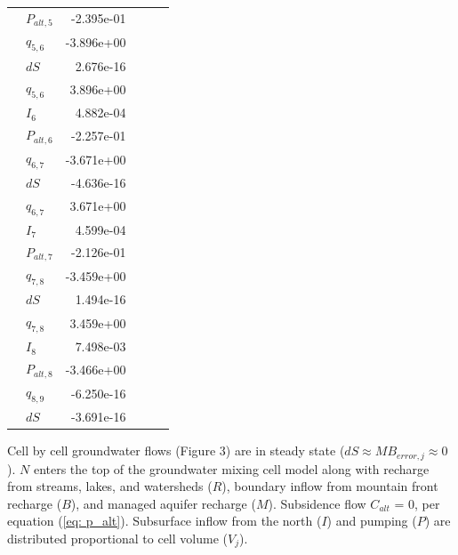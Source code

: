 \begin{threeparttable}
\begin{table}[H]
{\begin{tabular}{rlrrrr}
			& $P_{alt, 5}$ & -2.395e-01 \\ 
			& $q_{5,6}$ & -3.896e+00 \\ 
			& $dS$ & 2.676e-16 \\ 
			\hline
			\parbox[t]{2mm}{}
			& $q_{5,6}$ & 3.896e+00 \\ 
			& $I_6$ & 4.882e-04 \\ 
			& $P_{alt, 6}$ & -2.257e-01 \\ 
			& $q_{6,7}$ & -3.671e+00 \\ 
			& $dS$ & -4.636e-16 \\ 
			\hline
			\parbox[t]{2mm}{}
			& $q_{6,7}$ & 3.671e+00 \\ 
			& $I_7$ & 4.599e-04 \\ 
			& $P_{alt, 7}$ & -2.126e-01 \\ 
			& $q_{7,8}$ & -3.459e+00 \\ 
			& $dS$ & 1.494e-16 \\ 
			\hline
			\parbox[t]{2mm}{}
			& $q_{7,8}$ & 3.459e+00 \\ 
			& $I_8$ & 7.498e-03 \\ 
			& $P_{alt, 8}$ & -3.466e+00 \\ 
			& $q_{8,9}$ & -6.250e-16 \\ 
			& $dS$ & -3.691e-16 \\ 
			\hline
			
		\end{tabular}
	}
		Cell by cell groundwater flows (Figure 3) are in steady state ($dS \approx MB_{error, j} \approx 0$). $N$ enters the top of the groundwater mixing cell model along with recharge from streams, lakes, and watersheds ($R$), boundary inflow from mountain front recharge ($B$), and managed aquifer recharge ($M$). Subsidence flow $C_{alt}$ = 0, per equation (\ref{eq: p_alt}). Subsurface inflow from the north ($I$) and pumping ($P$) are distributed proportional to cell volume ($V_j$). 
		
		\label{ap_b_cbc}
	\end{table}
	
\end{threeparttable}

\egroup





